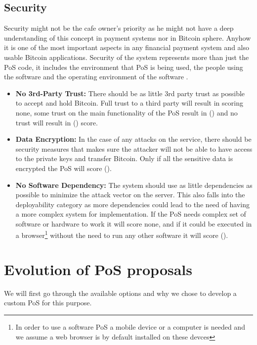 \subsection{Security} Security might not be the cafe owner's priority as he might not have a deep understanding of this concept in payment systems nor in Bitcoin sphere. Anyhow it is one of the most important aspects in any financial payment system and also usable Bitcoin applications. Security of the system represents more than just the PoS code, it includes the environment that PoS is being used, the people using the software and the operating environment of the software \cite{securityreq}.
\begin{itemize}

\item \textbf{No 3rd-Party Trust: }There should be as little 3rd party trust as possible to accept and hold Bitcoin. Full trust to a third party will result in scoring none, some trust on the main functionality of the PoS result in (\prt) and no trust will result in (\full)  score.

\item \textbf{Data Encryption: }In the case of any attacks on the service, there should be security measures that makes sure the attacker will not be able to have access to the private keys and transfer Bitcoin. Only if all the sensitive data is encrypted the PoS will score (\full).

\item \textbf{No Software Dependency: }The system should use as little dependencies as possible to minimize the attack vector on the server. This also falls into the deployability category as more dependencies could lead to the need of having a more complex system for implementation. If the PoS needs complex set of software or hardware to work it will score none, and if it could be executed in a browser\footnote{In order to use a software PoS a mobile device or a computer is needed and we assume a web browser is by default installed on these devces} without the need to run any other software it will score (\full).

\end{itemize}

\section{Evolution of PoS proposals}
We will first go through the available options and why we chose to develop a custom PoS for this purpose.

